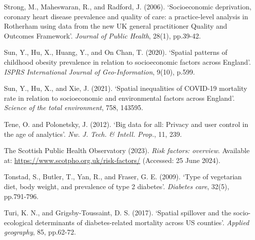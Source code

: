 \begin{Reference}
\begin{flushleft}
Strong, M., Maheswaran, R., and Radford, J. (2006). `Socioeconomic deprivation, coronary heart disease prevalence and quality of care: a practice-level analysis in Rotherham using data from the new UK general practitioner Quality and Outcomes Framework'. \textit{Journal of Public Health}, 28(1), pp.39-42.
\end{flushleft}
\vspace{2pt}


\begin{flushleft}
Sun, Y., Hu, X., Huang, Y., and On Chan, T. (2020). `Spatial patterns of childhood obesity prevalence in relation to socioeconomic factors across England'. \textit{ISPRS International Journal of Geo-Information}, 9(10), p.599.
\end{flushleft}
\vspace{2pt}


\begin{flushleft}
Sun, Y., Hu, X., and Xie, J. (2021). `Spatial inequalities of COVID-19 mortality rate in relation to socioeconomic and environmental factors across England'. \textit{Science of the total environment}, 758, 143595.
\end{flushleft}
\vspace{2pt}


\begin{flushleft}
Tene, O. and Polonetsky, J. (2012). `Big data for all: Privacy and user control in the age of analytics'. \textit{Nw. J. Tech. \& Intell. Prop.}, 11, 239.
\end{flushleft}
\vspace{7pt}


\begin{flushleft}
The Scottish Public Health Observatory (2023). \textit{Risk factors: overview}. Available at: \url{https://www.scotpho.org.uk/risk-factors/} (Accessed: 25 June 2024).
\end{flushleft}
\vspace{2pt}


\begin{flushleft}
Tonstad, S., Butler, T., Yan, R., and Fraser, G. E. (2009). `Type of vegetarian diet, body weight, and prevalence of type 2 diabetes'. \textit{Diabetes care}, 32(5), pp.791-796.
\end{flushleft}
\vspace{2pt}


\begin{flushleft}
Turi, K. N., and Grigsby-Toussaint, D. S. (2017). `Spatial spillover and the socio-ecological determinants of diabetes-related mortality across US counties'. \textit{Applied geography}, 85, pp.62-72.
\end{flushleft}
\vspace{2pt}



\end{Reference}
